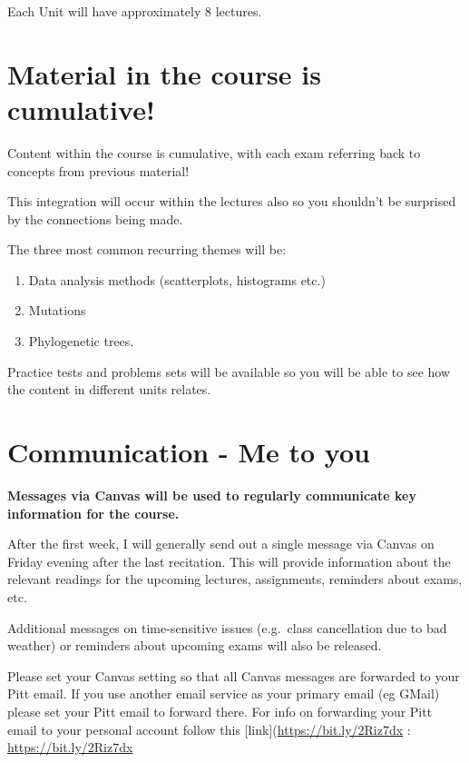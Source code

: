 \documentclass[
]{book}
\providecommand{\tightlist}{%
  \setlength{\itemsep}{0pt}\setlength{\parskip}{0pt}}
\begin{document}
Each Unit will have approximately 8 lectures.

\hypertarget{material-in-the-course-is-cumulative}{%
\chapter{Material in the course is cumulative!}\label{material-in-the-course-is-cumulative}}

Content within the course is cumulative, with each exam referring back to concepts from previous material!

This integration will occur within the lectures also so you shouldn't be surprised by the connections being made.

The three most common recurring themes will be:

\begin{enumerate}
\def\labelenumi{\arabic{enumi}.}
\tightlist
\item
  Data analysis methods (scatterplots, histograms etc.)
\item
  Mutations
\item
  Phylogenetic trees.
\end{enumerate}

Practice tests and problems sets will be available so you will be able to see how the content in different units relates.

\hypertarget{communication-me2u}{%
\chapter{Communication - Me to you}\label{communication-me2u}}

\textbf{Messages via Canvas will be used to regularly communicate key information for the course.}

After the first week, I will generally send out a single message via Canvas on Friday evening after the last recitation. This will provide information about the relevant readings for the upcoming lectures, assignments, reminders about exams, etc.

Additional messages on time-sensitive issues (e.g.~class cancellation due to bad weather) or reminders about upcoming exams will also be released.

Please set your Canvas setting so that all Canvas messages are forwarded to your Pitt email. If you use another email service as your primary email (eg GMail) please set your Pitt email to forward there.
For info on forwarding your Pitt email to your personal account follow this {[}link{]}(\url{https://bit.ly/2Riz7dx} : \url{https://bit.ly/2Riz7dx}
\end{document}
